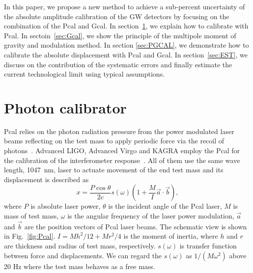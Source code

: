 \documentclass[A4]{spie}  %
\begin{document}
In this paper, we propose a new method to achieve a sub-percent uncertainty of the absolute amplitude calibration of the GW detectors by focusing on the combination of the Pcal and Gcal.
In section~\ref{sec:Pcal}, we explain how to calibrate with Pcal. In sectoin~\ref{sec:Gcal}, we show the principle of the multipole moment of gravity and modulation method.
In section \ref{sec:PGCAL}, we demonstrate how to calibrate the absolute displacement with Pcal and Gcal. In section~\ref{sec:EST}, we discuss on the contribution of the systematic errors and finally estimate the current technological limit using typical assumptions. 

\section{Photon calibrator} \label{sec:Pcal}
Pcal relies on the photon radiation pressure from the power modulated laser beams reflecting on the test mass to apply periodic force via the recoil of photons~\cite{doi:10.1063/1.4967303}. 
Advanced LIGO, Advanced Virgo and KAGRA employ the Pcal for the calibration of the interferometer response~\cite{0264-9381-34-1-015002, KAGRA_Pcal,0264-9381-32-2-024001}. All of them use the same wave length, 1047~nm, laser to actuate movement of the end test mass and its displacement is described as
\begin{equation}
 x = \frac{P \cos{\theta}}{2c} s(\omega)\left(1+\frac{M}{I}\vec{a} \cdot \vec{b} \right) , \label{eq:pcal}
\end{equation}
where $P$ is absolute laser power, $\theta$ is the incident angle of the Pcal laser, $M$ is  mass of test mass, $\omega$ is the angular frequency of the laser power modulation, $\vec{a}$ and $\vec{b}$ are the position vectors of Pcal laser beams. The schematic view is shown in Fig.~\ref{fig:Pcal}. $I=Mh^2/12+Mr^2/4$ is the moment of inertia, where $h$ and  $r$ are thickness and radius of test mass, respectively. $s(\omega)$ is transfer function between force and displacements. We can regard the $s(\omega)$ as $1/(M \omega^2)$ above 20 Hz where the test mass behaves as a free mass. 
\end{document}
